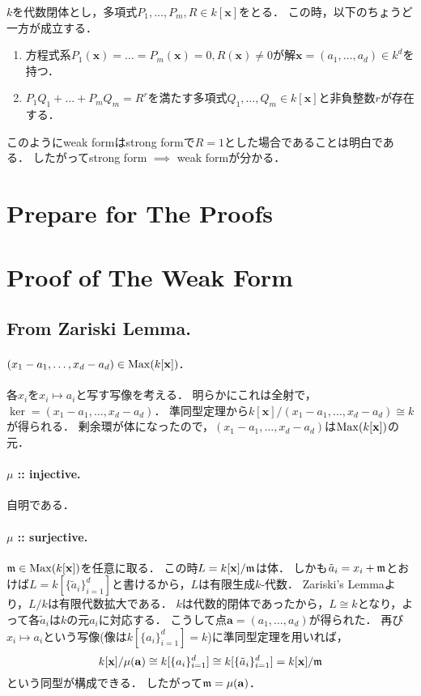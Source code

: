 \documentclass[a4paper]{jsarticle}
\newcommand{\kx}{k[\mathbf{x}]}
\begin{document}
    \begin{Thm}
        $k$を代数閉体とし，多項式$P_1, \dots, P_m, R\in \kx$をとる．
        この時，以下のちょうど一方が成立する．
        \begin{enumerate}[1.]
            \item 方程式系$P_1(\mathbf{x})=\ldots=P_m(\mathbf{x})=0, R(\mathbf{x}) \neq 0$が解$\mathbf{x}=(a_1, \dots, a_d) \in k^d$を持つ．
            \item$P_1 Q_1 + \ldots + P_m Q_m=R^r$を満たす多項式$Q_1,\ldots,Q_m \in \kx$と非負整数$r$が存在する．
        \end{enumerate}
    \end{Thm}
    このようにweak formはstrong formで$R=1$とした場合であることは明白である．
    したがってstrong form $\implies$ weak formが分かる．

\section{Prepare for The Proofs}
    
    

\section{Proof of The Weak Form}
    \subsection{From Zariski Lemma.}
    \paragraph{$(x_1-a_1, \dots, x_d-a_d) \in \Max(\kx)$.}
    各$x_i$を$x_i \mapsto a_i$と写す写像を考える．
    明らかにこれは全射で，$\ker = (x_1-a_1, \dots, x_d-a_d)$．
    準同型定理から$\kx/(x_1-a_1, \dots, x_d-a_d) \cong k$が得られる．
    剰余環が体になったので，$(x_1-a_1, \dots, x_d-a_d)$は$\Max(\kx)$の元．

    \paragraph{$\mu$ :: injective.}
    自明である．

    \paragraph{$\mu$ :: surjective.}
    $\I{m} \in \Max(\kx)$を任意に取る．
    この時$L=\kx/\I{m}$は体．
    しかも$\tilde{a}_i=x_i+\mathfrak{m}$とおけば$L=k[\{\tilde{a}_i\}_{i=1}^d]$と書けるから，$L$は有限生成$k$-代数．
    Zariski's Lemmaより，$L/k$は有限代数拡大である．
    $k$は代数的閉体であったから，$L \cong k$となり，よって各$\tilde{a}_i$は$k$の元$a_i$に対応する．
    こうして点$\mathbf{a}=(a_1,\dots,a_d)$が得られた．
    再び$x_i \mapsto a_i$という写像(像は$k[\{a_i\}_{i=1}^d]=k$)に準同型定理を用いれば，
    \[ \kx/\mu(\mathbf{a}) \cong k[\{a_i\}_{i=1}^d] \cong k[\{\tilde{a}_i\}_{i=1}^d]=\kx/\I{m} \]
    という同型が構成できる．
    したがって$\mathfrak{m}=\mu(\mathbf{a})$．
\end{document}
